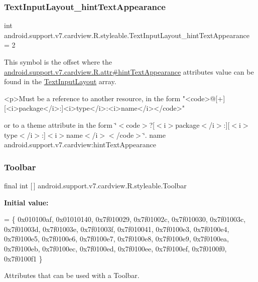 \subsubsection{\texorpdfstring{Text\+Input\+Layout\+\_\+hint\+Text\+Appearance}{TextInputLayout\_hintTextAppearance}}
{\footnotesize\ttfamily int android.\+support.\+v7.\+cardview.\+R.\+styleable.\+Text\+Input\+Layout\+\_\+hint\+Text\+Appearance = 2\hspace{0.3cm}{\ttfamily [static]}}

This symbol is the offset where the \hyperlink{classandroid_1_1support_1_1v7_1_1cardview_1_1R_1_1attr_a2ed878930a7df30fd4612610d89e716a}{android.\+support.\+v7.\+cardview.\+R.\+attr\#hint\+Text\+Appearance} attribute\textquotesingle{}s value can be found in the \hyperlink{classandroid_1_1support_1_1v7_1_1cardview_1_1R_1_1styleable_a9b23c31ffaf354f0f5cc4b82392ef6a4}{Text\+Input\+Layout} array.

\begin{DoxyVerb}      <p>Must be a reference to another resource, in the form "<code>@[+][<i>package</i>:]<i>type</i>:<i>name</i></code>"
\end{DoxyVerb}
 or to a theme attribute in the form \char`\"{}$<$code$>$?\mbox{[}$<$i$>$package$<$/i$>$\+:\mbox{]}\mbox{[}$<$i$>$type$<$/i$>$\+:\mbox{]}$<$i$>$name$<$/i$>$$<$/code$>$\char`\"{}.  name android.\+support.\+v7.\+cardview\+:hint\+Text\+Appearance \mbox{\label{classandroid_1_1support_1_1v7_1_1cardview_1_1R_1_1styleable_a26149aeb8fd339abe09ecc9d92b9304f}} 
\subsubsection{\texorpdfstring{Toolbar}{Toolbar}}
{\footnotesize\ttfamily final int \mbox{[}$\,$\mbox{]} android.\+support.\+v7.\+cardview.\+R.\+styleable.\+Toolbar\hspace{0.3cm}{\ttfamily [static]}}

{\bfseries Initial value\+:}
\begin{DoxyCode}
= \{
            0x010100af, 0x01010140, 0x7f010029, 0x7f01002c,
            0x7f010030, 0x7f01003c, 0x7f01003d, 0x7f01003e,
            0x7f01003f, 0x7f010041, 0x7f0100e3, 0x7f0100e4,
            0x7f0100e5, 0x7f0100e6, 0x7f0100e7, 0x7f0100e8,
            0x7f0100e9, 0x7f0100ea, 0x7f0100eb, 0x7f0100ec,
            0x7f0100ed, 0x7f0100ee, 0x7f0100ef, 0x7f0100f0,
            0x7f0100f1
        \}
\end{DoxyCode}
Attributes that can be used with a Toolbar. 

